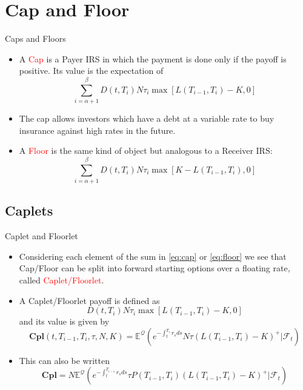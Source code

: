 \documentclass{beamer}
\begin{document}
\section{Cap and Floor}
\begin{frame}{Caps and Floors}
	\begin{itemize}
		\item<1-> A \textcolor{red}{Cap} is a Payer IRS in which the payment is done only if the payoff is positive. Its value is the expectation of 
		\begin{equation}
			\sum_{i=\alpha+1}^{\beta}D(t,T_i)N\tau_i\max\left[L(T_{i-1},T_i)-K,0\right]
			\label{eq:cap}
		\end{equation} 
		\item<1-> The cap allows investors which have a debt at a variable rate to buy insurance against high rates in the future.
	
		\item<2-> A \textcolor{red}{Floor} is the same kind of object but analogous to a Receiver IRS:
		\begin{equation}
			\sum_{i=\alpha+1}^{\beta}D(t,T_i)N\tau_i\max\left[K-L(T_{i-1},T_i),0\right]
			\label{eq:floor}
		\end{equation} 
	\end{itemize}
\end{frame}

\subsection{Caplets}
\begin{frame}{Caplet and Floorlet}
	\begin{itemize}
		\item<1-> Considering each element of the sum in \cref{eq:cap} or \cref{eq:floor} we see that Cap/Floor can be split into forward starting options over a floating rate, called \textcolor{red}{Caplet/Floorlet}.
		\item<2-> A Caplet/Floorlet payoff is defined as
		\begin{equation*}
			D(t,T_i)N\tau_i\max\left[L(T_{i-1},T_i)-K,0\right]
		\end{equation*} 
		and its value is given by
		\begin{equation}
			\textbf{Cpl}(t,T_{i-1},T_i,\tau,N,K)=\mathbb{E}^{\mathcal{Q}}\left(e^{-\int_t^{T_i}r_s ds}N\tau(L(T_{i-1},T_i)-K)^+ | \mathcal{F}_t\right)
		\end{equation}
		\item This can also be written
		\begin{equation*}
			\textbf{Cpl}=N\mathbb{E}^{\mathcal{Q}}\left(e^{-\int_t^{T_{i-1}}r_s ds}\tau P(T_{i-1},T_i)(L(T_{i-1},T_i)-K)^+ | \mathcal{F}_t\right)
		\end{equation*}
	\end{itemize}
\end{frame}
\end{document}
